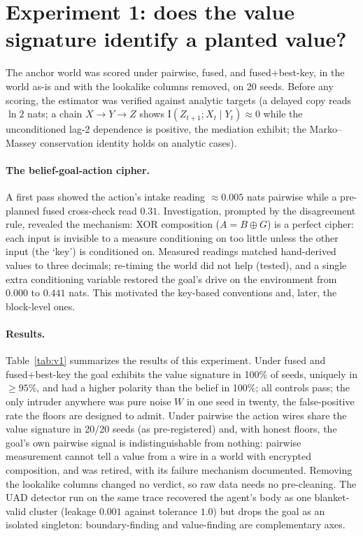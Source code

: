 \documentclass[11pt]{article}
\newcommand{\I}{\mathrm{I}}
\newcommand{\gplus}{\oplus}
\begin{document}
\section{Experiment 1: does the value signature identify a planted value?}\label{sec:v1}

The anchor world was scored under pairwise, fused, and fused+best-key, in the world
as-is and with the lookalike columns removed, on 20 seeds. Before any scoring, the
estimator was verified against analytic targets (a delayed copy reads $\ln 2$ nats; a
chain $X\to Y\to Z$ shows $\I(Z_{t+1};X_t\mid Y_t)\approx 0$ while the unconditioned
lag-2 dependence is positive, the mediation exhibit; the Marko--Massey conservation
identity holds on analytic cases).

\paragraph{The belief-goal-action cipher.}
A first pass showed the action's intake reading $\approx 0.005$ nats pairwise while a
pre-planned fused cross-check read $0.31$. Investigation, prompted by the disagreement
rule, revealed the mechanism: XOR composition ($A=B\gplus G$) is a perfect cipher:
each input is invisible to a measure conditioning on too little unless the other input
(the `key') is conditioned on. Measured readings matched hand-derived values to three
decimals; re-timing the world did not help (tested), and a single extra conditioning
variable restored the goal's drive on the environment from $0.000$ to $0.441$ nats. 
This motivated the key-based conventions and, later, the
block-level ones.

\paragraph{Results.}
Table~\ref{tab:v1} summarizes the results of this experiment. Under fused and
fused+best-key the goal exhibits the value signature in 100\% of seeds, uniquely in
$\geq 95\%$, and had a higher polarity than the belief in
100\%; all controls pass; the only intruder anywhere was pure noise $W$ in
one seed in twenty, the false-positive rate the floors are designed to admit. Under
pairwise the action wires share the value signature in 20/20 seeds (as pre-registered) and,
with honest floors, the goal's own pairwise signal is indistinguishable from nothing:
pairwise measurement cannot tell a value from a wire in a world with encrypted
composition, and was retired, with its failure mechanism documented. Removing the lookalike
columns changed no verdict, so raw data needs no pre-cleaning. The UAD detector run on
the same trace recovered the agent's body as one blanket-valid cluster (leakage $0.001$
against tolerance $1.0$) but drops the goal as an isolated singleton: boundary-finding
and value-finding are complementary axes.
\end{document}
